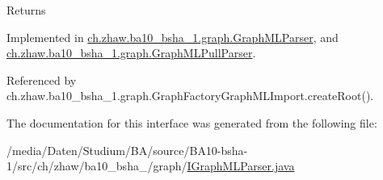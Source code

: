 \begin{DoxyReturn}{Returns}

\end{DoxyReturn}


Implemented in \hyperlink{classch_1_1zhaw_1_1ba10__bsha__1_1_1graph_1_1GraphMLParser_ae127bee890029b56abc11c84d2badd1c}{ch.zhaw.ba10\_\-bsha\_\-1.graph.GraphMLParser}, and \hyperlink{classch_1_1zhaw_1_1ba10__bsha__1_1_1graph_1_1GraphMLPullParser_a4d51cf5d2432541f6777df36b8649d70}{ch.zhaw.ba10\_\-bsha\_\-1.graph.GraphMLPullParser}.

Referenced by ch.zhaw.ba10\_\-bsha\_\-1.graph.GraphFactoryGraphMLImport.createRoot().

The documentation for this interface was generated from the following file:\begin{DoxyCompactItemize}
\item 
/media/Daten/Studium/BA/source/BA10-\/bsha-\/1/src/ch/zhaw/ba10\_\-bsha\_/graph/\hyperlink{IGraphMLParser_8java}{IGraphMLParser.java}\end{DoxyCompactItemize}
